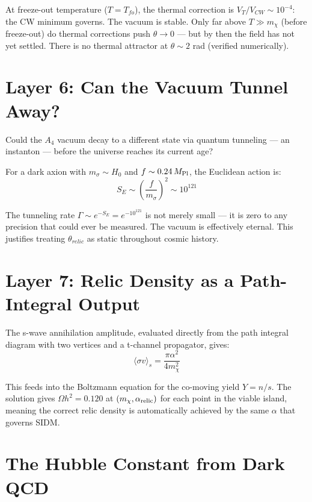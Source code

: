 At freeze-out temperature ($T = T_{fo}$), the thermal correction is
$V_T/V_{CW} \sim 10^{-4}$: the CW minimum governs. The vacuum is stable.
Only far above $T \gg m_\chi$ (before freeze-out) do thermal corrections
push $\theta \to 0$ — but by then the field has not yet settled.
There is no thermal attractor at $\theta \sim 2$ rad (verified numerically).

\section{Layer 6: Can the Vacuum Tunnel Away?}
\label{ch2:instanton}

Could the $A_4$ vacuum decay to a different state via quantum tunneling —
an instanton — before the universe reaches its current age?

For a dark axion with $m_\sigma \sim H_0$ and $f \sim 0.24\,M_{\rm Pl}$,
the Euclidean action is:
\begin{equation}
  S_E \sim \left(\frac{f}{m_\sigma}\right)^2 \sim 10^{121}
\end{equation}

The tunneling rate $\Gamma \sim e^{-S_E} = e^{-10^{121}}$ is not merely small
— it is zero to any precision that could ever be measured. The vacuum is
effectively eternal. This justifies treating $\theta_{relic}$ as static
throughout cosmic history.

\section{Layer 7: Relic Density as a Path-Integral Output}
\label{ch2:relic}

The s-wave annihilation amplitude, evaluated directly from the path integral
diagram with two vertices and a t-channel propagator, gives:
\begin{equation}
  \langle\sigma v\rangle_s = \frac{\pi\alpha^2}{4m_\chi^2}
\end{equation}

This feeds into the Boltzmann equation for the co-moving yield $Y = n/s$.
The solution gives $\Omega h^2 = 0.120$ at $(m_\chi, \alpha_{\rm relic})$
for each point in the viable island, meaning the correct relic density
is automatically achieved by the same $\alpha$ that governs SIDM.

\section{The Hubble Constant from Dark QCD}
\label{ch2:h0}

